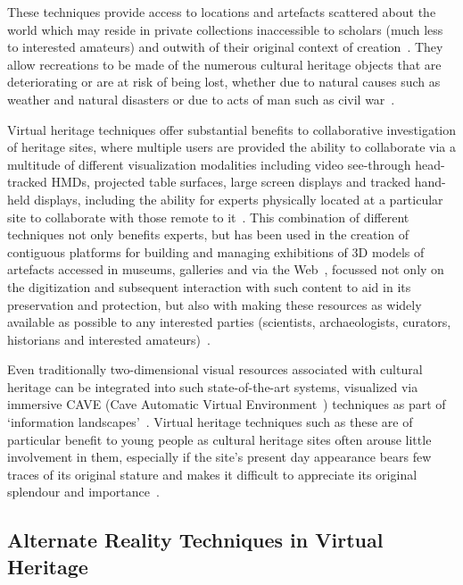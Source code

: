These techniques provide access to locations and artefacts scattered about the world which may reside in private collections inaccessible to scholars (much less to interested amateurs) and outwith of their original context of creation~\cite{griffin:recovering}. They allow recreations to be made of the numerous cultural heritage objects that are deteriorating or are at risk of being lost, whether due to natural causes such as weather and natural disasters or due to acts of man such as civil war~\cite{Ikeuchi2003}.

Virtual heritage techniques offer substantial benefits to collaborative investigation of heritage sites, where multiple users are provided the ability to collaborate via a multitude of different visualization modalities including video see-through head-tracked HMDs, projected table surfaces, large screen displays and tracked hand-held displays, including the ability for experts physically located at a particular site to collaborate with those remote to it~\cite{benko:collaborative}. This combination of different techniques not only benefits experts, but has been used in the creation of contiguous platforms for building and managing exhibitions of 3D models of artefacts accessed in museums, galleries and via the Web~\cite{Wojciechowski2004}, focussed not only on the digitization and subsequent interaction with such content to aid in its preservation and protection, but also with making these resources as widely available as possible to any interested parties (scientists, archaeologists, curators, historians and interested amateurs)~\cite{walczak:applications}.

Even traditionally two-dimensional visual resources associated with cultural heritage can be integrated into such state-of-the-art systems, visualized via immersive CAVE (Cave Automatic Virtual Environment~\cite{Tzortzaki2002}) techniques as part of `information landscapes'~\cite{Ruffaldi2008}. Virtual heritage techniques such as these are of particular benefit to young people as cultural heritage sites often arouse little involvement in them, especially if the site's present day appearance bears few traces of its original stature and makes it difficult to appreciate its original splendour and importance~\cite{ardito:combining}.


\subsection{Alternate Reality Techniques in Virtual Heritage}

